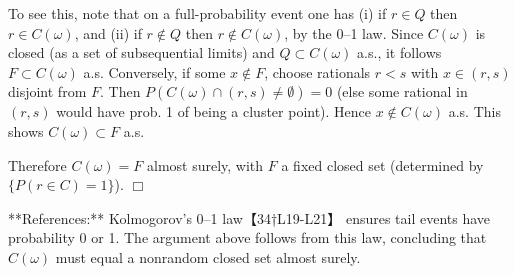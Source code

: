 \documentclass[11pt]{article}
\begin{document}
To see this, note that on a full-probability event one has (i) if $r\in Q$ then $r\in C(\omega)$, and (ii) if $r\notin Q$ then $r\notin C(\omega)$, by the 0–1 law. Since $C(\omega)$ is closed (as a set of subsequential limits) and $Q\subset C(\omega)$ a.s., it follows $F\subset C(\omega)$ a.s. Conversely, if some $x\notin F$, choose rationals $r<s$ with $x\in(r,s)$ disjoint from $F$. Then $P(C(\omega)\cap(r,s)\neq\emptyset)=0$ (else some rational in $(r,s)$ would have prob. 1 of being a cluster point). Hence $x\notin C(\omega)$ a.s. This shows $C(\omega)\subset F$ a.s.

Therefore $C(\omega)=F$ almost surely, with $F$ a fixed closed set (determined by $\{P(r\in C)=1\}$). $\Box$

**References:** Kolmogorov’s 0–1 law【34†L19-L21】 ensures tail events have probability 0 or 1. The argument above follows from this law, concluding that $C(\omega)$ must equal a nonrandom closed set almost surely.
\end{document}
